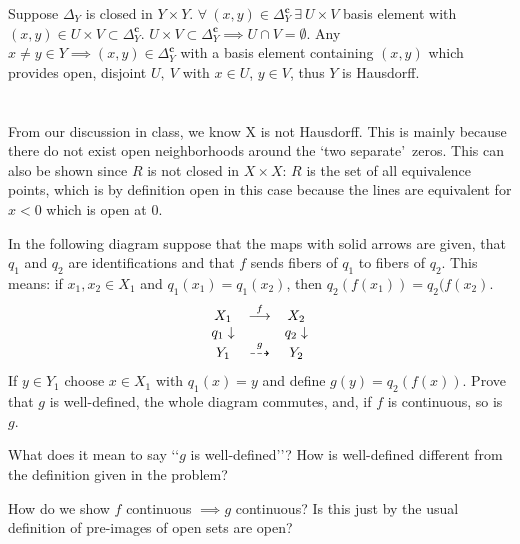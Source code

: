 \documentclass{jhwhw}
\begin{document}
\noindent
Suppose $\Delta_Y$ is closed in $Y\times Y$. $\forall\ (x,y)\in \Delta_Y^{\mathbf{c}}\  \exists\ U\times V$ basis element with $(x,y)\in U\times V \subset \Delta_Y^{\mathbf{c}}$. $U\times V \subset \Delta_Y^{\mathbf{c}} \implies U\cap V=\emptyset$. Any $x\ne y\in Y \implies (x,y)\in \Delta_Y^{\mathbf{c}}$ with a basis element containing $(x,y)$ which provides open, disjoint $U,\ V$ with $x\in U$, $y\in V$, thus $Y$ is Hausdorff.

\part{}%
\noindent From our discussion in class, we know X is not Hausdorff. This is mainly because there do not exist open neighborhoods around the \lq two separate\rq\ zeros. This can also be shown since $R$ is not closed in $X\times X$: $R$ is the set of all equivalence points, which is by definition open in this case because the lines are equivalent for $x<0$ which is open at 0.

\problem{} %
\noindent
In the following diagram suppose that the maps with solid arrows are given, that $q_1$ and $q_2$ are identifications and that $f$ sends fibers of $q_1$ to fibers of $q_2$.  This means:   if $x_1,x_2\in X_1$ and $q_1(x_1) = q_1(x_2)$, then $q_2(f(x_1)) = q_2(f(x_2)$.
\begin{eqnarray*}
	\begin{array}{ccc}
		X_1 & \buildrel f \over\longrightarrow & X_2 \\
		{q_1}\downarrow &  & {q_2}\downarrow\\
		Y_1 & \buildrel g \over\dashrightarrow & Y_2
	\end{array}
\end{eqnarray*}
If $y\in Y_1$ choose  $x\in X_1$ with $q_1(x) = y$ and define $g(y) = q_2(f(x))$.  Prove that $g$ is well-defined, the whole diagram commutes, and, if $f$ is continuous, so is $g$.
\solution{}
\noindent


What does it mean to say \lq\lq $g$ is well-defined\rq\rq ? How is well-defined different from the definition given in the problem?

How do we show $f$ continuous $\implies g$ continuous? Is this just by the usual definition of pre-images of open sets are open?
\end{document}
